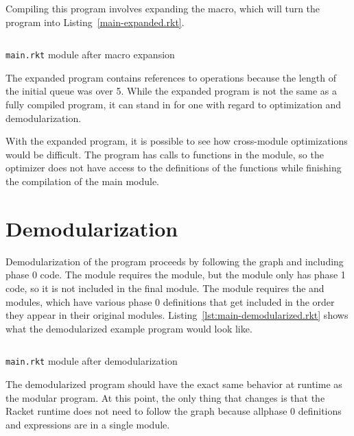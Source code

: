 Compiling this program involves expanding the  macro, which will turn the program into Listing~\ref{main-expanded.rkt}.

\begin{listing}
  \inputminted{racket}{listings/main-expanded.rkt}
  \caption{\texttt{main.rkt} module after macro expansion}
  \label{lst:main-expanded.rkt}
\end{listing}

The expanded program contains references to  operations because the length of the initial queue was over 5.
While the expanded program is not the same as a fully compiled program, it can stand in for one with regard to optimization and demodularization.

With the expanded program, it is possible to see how cross-module optimizations would be difficult.
The program has calls to functions in the  module, so the optimizer does not have access to the definitions of the functions while finishing the compilation of the main module.

\section{Demodularization}

Demodularization of the program proceeds by following the  graph and including phase 0 code. 
The  module requires the  module, but the  module only has phase 1 code, so it is not included in the final module.
The  module requires the  and  modules, which have various phase 0 definitions that get included in the order they appear in their original modules.
Listing~\ref{lst:main-demodularized.rkt} shows what the demodularized example program would look like.

\begin{listing}
  \inputminted{racket}{listings/main-demodularized.rkt}
  \caption{\texttt{main.rkt} module after demodularization}
  \label{lst:main-demodularized.rkt}
\end{listing}

The demodularized program should have the exact same behavior at runtime as the modular program.
At this point, the only thing that changes is that the Racket runtime does not need to follow the  graph because allphase 0 definitions and expressions are in a single module.

